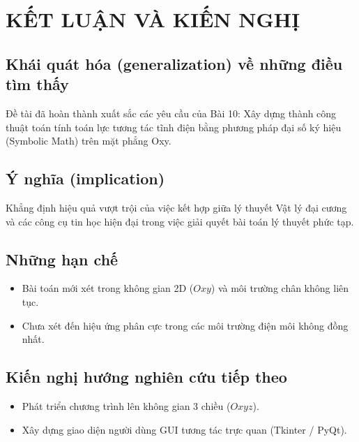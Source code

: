 \section{KẾT LUẬN VÀ KIẾN NGHỊ}
\subsection{Khái quát hóa (generalization) về những điều tìm thấy}
    Đề tài đã hoàn thành xuất sắc các yêu cầu của Bài 10: Xây dựng thành công thuật toán tính toán lực tương tác tĩnh điện bằng phương pháp đại số ký hiệu (Symbolic Math) trên mặt phẳng Oxy.\par
\subsection{Ý nghĩa (implication)}
    Khẳng định hiệu quả vượt trội của việc kết hợp giữa lý thuyết Vật lý đại cương và các công cụ tin học hiện đại trong việc giải quyết bài toán lý thuyết phức tạp.\par
\subsection{Những hạn chế}
    \begin{itemize}[leftmargin=1.2cm]
    \item Bài toán mới xét trong không gian 2D ($Oxy$) và môi trường chân không liên tục.
    \end{itemize}
    \begin{itemize}[leftmargin=1.2cm]
    \item Chưa xét đến hiệu ứng phân cực trong các môi trường điện môi không đồng nhất.
    \end{itemize}
\subsection{Kiến nghị hướng nghiên cứu tiếp theo}
    \begin{itemize}[leftmargin=1.2cm]
    \item Phát triển chương trình lên không gian 3 chiều ($Oxyz$).
    \end{itemize}
    \begin{itemize}[leftmargin=1.2cm]
    \item Xây dựng giao diện người dùng GUI tương tác trực quan (Tkinter / PyQt).
    \end{itemize}